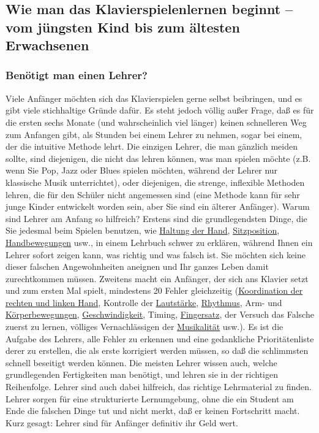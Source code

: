 
\subsection{Wie man das Klavierspielenlernen beginnt -- vom jüngsten Kind bis zum ältesten Erwachsenen}
\label{c1iii18}

\subsubsection{Benötigt man einen Lehrer?}
\label{c1iii18a}

Viele Anfänger möchten sich das Klavierspielen gerne selbst beibringen, und es gibt viele stichhaltige Gründe dafür.
Es steht jedoch völlig außer Frage, daß es für die ersten sechs Monate (und wahrscheinlich viel länger) keinen schnelleren Weg zum Anfangen gibt, als Stunden bei einem Lehrer zu nehmen, sogar bei einem, der die intuitive Methode lehrt.
Die einzigen Lehrer, die man gänzlich meiden sollte, sind diejenigen, die nicht das lehren können, was man spielen möchte (z.B. wenn Sie Pop, Jazz oder Blues spielen möchten, während der Lehrer nur klassische Musik unterrichtet), oder diejenigen, die strenge, inflexible Methoden lehren, die für den Schüler nicht angemessen sind (eine Methode kann für sehr junge Kinder entwickelt worden sein, aber Sie sind ein älterer Anfänger).
Warum sind Lehrer am Anfang so hilfreich?
Erstens sind die grundlegendsten Dinge, die Sie jedesmal beim Spielen benutzen, wie \hyperref[c1ii2]{Haltung der Hand}, \hyperref[c1ii3]{Sitzposition}, \hyperref[c1iii4]{Handbewegungen} usw., in einem Lehrbuch schwer zu erklären, während Ihnen ein Lehrer sofort zeigen kann, was richtig und was falsch ist.
Sie möchten sich keine dieser falschen Angewohnheiten aneignen und Ihr ganzes Leben damit zurechtkommen müssen.
Zweitens macht ein Anfänger, der sich ans Klavier setzt und zum ersten Mal spielt, mindestens 20 Fehler gleichzeitig (\hyperref[c1ii25]{Koordination der rechten und linken Hand}, Kontrolle der \hyperref[c1iii14d]{Lautstärke}, \hyperref[c1iii1b]{Rhythmus}, Arm- und \hyperref[c1iii4c]{Körperbewegungen}, \hyperref[c1ii13]{Geschwindigkeit}, Timing, \hyperref[c1ii18]{Fingersatz}, der Versuch das Falsche zuerst zu lernen, völliges Vernachlässigen der \hyperref[c1iii14d]{Musikalität} usw.).
Es ist die Aufgabe des Lehrers, alle Fehler zu erkennen und eine gedankliche Prioritätenliste derer zu erstellen, die als erste korrigiert werden müssen, so daß die schlimmsten schnell beseitigt werden können.
Die meisten Lehrer wissen auch, welche grundlegenden Fertigkeiten man benötigt, und lehren sie in der richtigen Reihenfolge.
Lehrer sind auch dabei hilfreich, das richtige Lehrmaterial zu finden.
Lehrer sorgen für eine strukturierte Lernumgebung, ohne die ein Student am Ende die falschen Dinge tut und nicht merkt, daß er keinen Fortschritt macht.
Kurz gesagt: Lehrer sind für Anfänger definitiv ihr Geld wert.


